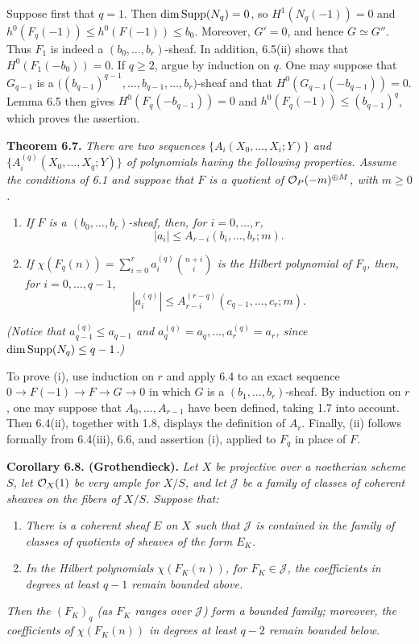 Suppose first that $q=1$. Then $\dim\operatorname{Supp}(N_q)=0$, so
$H^1(N_q(-1))=0$ and $h^0(F_q(-1))\leq h^0(F(-1))\leq b_0$.
Moreover, $G'=0$, and hence $G\simeq G''$. Thus $F_1$ is indeed a $(b_0,\ldots,b_r)$-sheaf. In addition, 6.5(ii) shows that
$H^0(F_1(-b_0))=0$. If $q\geq2$, argue by induction on $q$. One may
suppose that $G_{q-1}$ is a
$\bigl((b_{q-1})^{q-1},\ldots,b_{q-1},\ldots,b_r\bigr)$-sheaf and that
$H^0(G_{q-1}(-b_{q-1}))=0$. Lemma 6.5 then gives
$H^0(F_q(-b_{q-1}))=0$ and $h^0(F_q(-1))\leq(b_{q-1})^q$,
which proves the assertion.

\textbf{Theorem 6.7.} \emph{There are two sequences
$\{A_i(X_0,\ldots,X_i;Y)\}$ and
$\{A_i^{(q)}(X_0,\ldots,X_q;Y)\}$ of polynomials having the following
properties. Assume the conditions of 6.1 and suppose that $F$ is a
quotient of $\mathcal O_P(-m)^{\oplus M}$, with $m\geq0$.}
\begin{enumerate}[label=(\roman*)]
\item \emph{If $F$ is a $(b_0,\ldots,b_r)$-sheaf, then, for
$i=0,\ldots,r$,}
\[
  |a_i|\leq A_{r-i}(b_i,\ldots,b_r;m).
\]
\item \emph{If
$\chi(F_q(n))=\sum_{i=0}^{r}a_i^{(q)}\binom{n+i}{i}$ is the Hilbert
polynomial of $F_q$, then, for $i=0,\ldots,q-1$,}
\[
  |a_i^{(q)}|\leq A_{r-i}^{(r-q)}(c_{q-1},\ldots,c_r;m).
\]
\end{enumerate}
\emph{(Notice that $a_{q-1}^{(q)}\leq a_{q-1}$ and
$a_q^{(q)}=a_q,\ldots,a_r^{(q)}=a_r$, since
$\dim\operatorname{Supp}(N_q)\leq q-1$.)}

To prove (i), use induction on $r$ and apply 6.4 to an exact sequence
$0\longrightarrow F(-1)\longrightarrow F\longrightarrow G\longrightarrow0$
in which $G$ is a $(b_1,\ldots,b_r)$-sheaf. By induction on $r$, one may
suppose that $A_0,\ldots,A_{r-1}$ have been defined, taking 1.7 into
account. Then 6.4(ii), together with 1.8, displays the definition of
$A_r$. Finally, (ii) follows formally from 6.4(iii), 6.6, and assertion
(i), applied to $F_q$ in place of $F$.

\textbf{Corollary 6.8. (Grothendieck).} \emph{Let $X$ be projective over
a noetherian scheme $S$, let $\mathcal O_X(1)$ be very ample for $X/S$, and let
$\mathcal J$ be a family of classes of coherent sheaves on the fibers of
$X/S$. Suppose that:}
\begin{enumerate}[label=(\alph*)]
\item \emph{There is a coherent sheaf $E$ on $X$ such that $\mathcal J$
is contained in the family of classes of quotients of sheaves of the
form $E_K$.}
\item[$(b_q)$] \emph{In the Hilbert polynomials $\chi(F_K(n))$, for
$F_K\in\mathcal J$, the coefficients in degrees at least $q-1$ remain
bounded above.}
\end{enumerate}
\emph{Then the $(F_K)_q$ (as $F_K$ ranges over $\mathcal J$) form a
bounded family; moreover, the coefficients of $\chi(F_K(n))$ in degrees
at least $q-2$ remain bounded below.}


